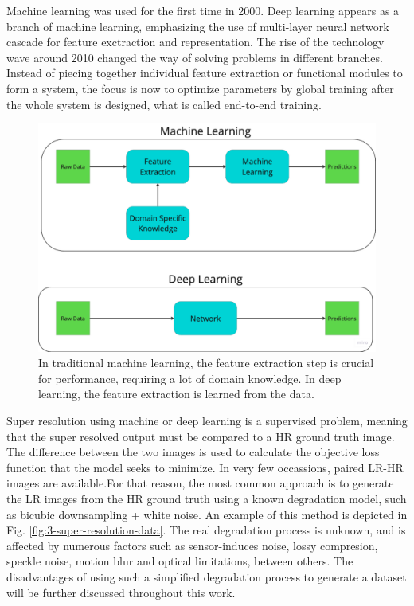     Machine learning was used for the first time in 2000. 
    Deep learning appears as a branch of machine learning, emphasizing the use of multi-layer neural network cascade for feature exctraction and representation. 
    The rise of the technology wave around 2010 changed the way of solving problems in different branches.
    Instead of piecing together individual feature extraction or functional modules to form a system, the focus is now to optimize parameters by global training after the whole system is designed, what is called end-to-end training.

    \begin{figure}[H]
        \centering
        \includegraphics[width=\textwidth]{Includes/2-end-to-end-training.pdf}
        \caption{In traditional machine learning, the feature extraction step is crucial for performance, requiring a lot of domain knowledge. In deep learning, the feature extraction is learned from the data.}
        \label{fig:2-end-to-end-training}
    \end{figure}

    Super resolution using machine or deep learning is a supervised problem, meaning that the super resolved output must be compared to a HR ground truth image. 
    The difference between the two images is used to calculate the objective loss function that the model seeks to minimize.
    In very few occassions, paired LR-HR images are available.For that reason, the most common approach is to generate the LR images from the HR ground truth using a known degradation model, such as bicubic downsampling + white noise. An example of this method is depicted in Fig. \ref{fig:3-super-resolution-data}. 
    The real degradation process is unknown, and is affected by numerous factors such as sensor-induces noise, lossy compresion, speckle noise, motion blur and optical limitations, between others.
    The disadvantages of using such a simplified degradation process to generate a dataset will be further discussed throughout this work.

